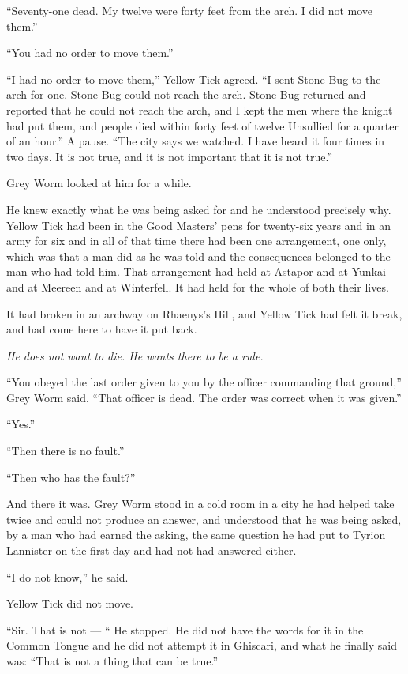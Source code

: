 “Seventy-one dead. My twelve were forty feet from the arch. I did not move them.”

“You had no order to move them.”

“I had no order to move them,” Yellow Tick agreed. “I sent Stone Bug to the arch for one. Stone Bug could not reach the arch. Stone Bug returned and reported that he could not reach the arch, and I kept the men where the knight had put them, and people died within forty feet of twelve Unsullied for a quarter of an hour.” A pause. “The city says we watched. I have heard it four times in two days. It is not true, and it is not important that it is not true.”

Grey Worm looked at him for a while.

He knew exactly what he was being asked for and he understood precisely why. Yellow Tick had been in the Good Masters’ pens for twenty-six years and in an army for six and in all of that time there had been one arrangement, one only, which was that a man did as he was told and the consequences belonged to the man who had told him. That arrangement had held at Astapor and at Yunkai and at Meereen and at Winterfell. It had held for the whole of both their lives.

It had broken in an archway on Rhaenys’s Hill, and Yellow Tick had felt it break, and had come here to have it put back.

\textit{He does not want to die. He wants there to be a rule.}

“You obeyed the last order given to you by the officer commanding that ground,” Grey Worm said. “That officer is dead. The order was correct when it was given.”

“Yes.”

“Then there is no fault.”

“Then who has the fault?”

And there it was. Grey Worm stood in a cold room in a city he had helped take twice and could not produce an answer, and understood that he was being asked, by a man who had earned the asking, the same question he had put to Tyrion Lannister on the first day and had not had answered either.

“I do not know,” he said.

Yellow Tick did not move.

“Sir. That is not — “ He stopped. He did not have the words for it in the Common Tongue and he did not attempt it in Ghiscari, and what he finally said was: “That is not a thing that can be true.”


